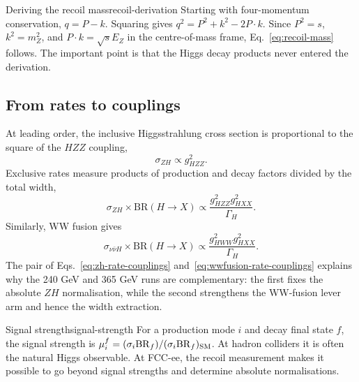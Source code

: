 \documentclass[11pt,a4paper]{article}
\newcommand{\BR}{\mathrm{BR}}
\numberwithin{equation}{section}
\begin{document}
\begin{examplebox}{Deriving the recoil mass}{recoil-derivation}
Starting with four-momentum conservation, \(q=P-k\). Squaring gives \(q^2=P^2+k^2-2P\cdot k\). Since \(P^2=s\), \(k^2=m_Z^2\), and \(P\cdot k=\sqrt{s}E_Z\) in the centre-of-mass frame, Eq.~\eqref{eq:recoil-mass} follows. The important point is that the Higgs decay products never entered the derivation.
\end{examplebox}

\subsection{From rates to couplings}
At leading order, the inclusive Higgsstrahlung cross section is proportional to the square of the \(HZZ\) coupling,
\begin{equation}
  \sigma_{ZH}\propto g_{HZZ}^2 .
\end{equation}
Exclusive rates measure products of production and decay factors divided by the total width,
\begin{equation}
  \sigma_{ZH}\times \BR(H\to X)
  \propto
  \frac{g_{HZZ}^2 g_{HXX}^2}{\Gamma_H} .
  \label{eq:zh-rate-couplings}
\end{equation}
Similarly, WW fusion gives
\begin{equation}
  \sigma_{\nu\bar\nu H}\times \BR(H\to X)
  \propto
  \frac{g_{HWW}^2 g_{HXX}^2}{\Gamma_H} .
  \label{eq:wwfusion-rate-couplings}
\end{equation}
The pair of Eqs.~\eqref{eq:zh-rate-couplings} and~\eqref{eq:wwfusion-rate-couplings} explains why the 240 GeV and 365 GeV runs are complementary: the first fixes the absolute \(ZH\) normalisation, while the second strengthens the WW-fusion lever arm and hence the width extraction.

\begin{definition}{Signal strength}{signal-strength}
For a production mode \(i\) and decay final state \(f\), the signal strength is \(\mu_i^f=(\sigma_i\BR_f)/(\sigma_i\BR_f)_{\rm SM}\). At hadron colliders it is often the natural Higgs observable. At FCC-ee, the recoil measurement makes it possible to go beyond signal strengths and determine absolute normalisations.
\end{definition}
\end{document}
